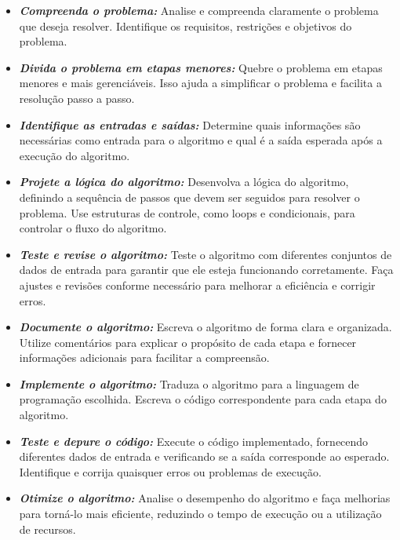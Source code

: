 \documentclass[a4paper, 12pt, onecolumn,singlespacing]{article}
\begin{document}
	\begin{itemize}
		
		\item \textbf{\textit{Compreenda o problema:}} Analise e compreenda claramente o problema que deseja resolver. Identifique os requisitos, restrições e objetivos do problema.
		
		\item \textbf{\textit{Divida o problema em etapas menores:}} Quebre o problema em etapas menores e mais gerenciáveis. Isso ajuda a simplificar o problema e facilita a resolução passo a passo.
		
		\item \textbf{\textit{Identifique as entradas e saídas:}} Determine quais informações são necessárias como entrada para o algoritmo e qual é a saída esperada após a execução do algoritmo.
		
		\item \textbf{\textit{Projete a lógica do algoritmo:}} Desenvolva a lógica do algoritmo, definindo a sequência de passos que devem ser seguidos para resolver o problema. Use estruturas de controle, como loops e condicionais, para controlar o fluxo do algoritmo.
		
		\item \textbf{\textit{Teste e revise o algoritmo:}} Teste o algoritmo com diferentes conjuntos de dados de entrada para garantir que ele esteja funcionando corretamente. Faça ajustes e revisões conforme necessário para melhorar a eficiência e corrigir erros.
		
		\item \textbf{\textit{Documente o algoritmo:}} Escreva o algoritmo de forma clara e organizada. Utilize comentários para explicar o propósito de cada etapa e fornecer informações adicionais para facilitar a compreensão.
		
		\item \textbf{\textit{Implemente o algoritmo:}} Traduza o algoritmo para a linguagem de programação escolhida. Escreva o código correspondente para cada etapa do algoritmo.
		
		\item \textbf{\textit{Teste e depure o código:}} Execute o código implementado, fornecendo diferentes dados de entrada e verificando se a saída corresponde ao esperado. Identifique e corrija quaisquer erros ou problemas de execução.
		
		\item \textbf{\textit{Otimize o algoritmo:}} Analise o desempenho do algoritmo e faça melhorias para torná-lo mais eficiente, reduzindo o tempo de execução ou a utilização de recursos.
		
	\end{itemize}
	
\end{document}
